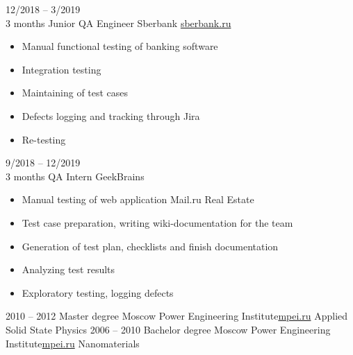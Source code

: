 \documentclass[10pt]{developercv} %
\begin{document}
\begin{entrylist}
	\entry
		{\small{12/2018 -- 3/2019}\\{\footnotesize{3 months}}}
		{Junior QA Engineer}
		{Sberbank \slashsep \href{https://www.sberbank.ru}{sberbank.ru}}
		{
			\vspace{-\baselineskip}
			\begin{itemize}
				\setlength\itemsep{0pt}
				\setlength\itemindent{-\baselineskip}
				\item{Manual functional testing of banking software}
				\item{Integration testing}
				\item{Maintaining of test cases}
				\item{Defects logging and tracking through Jira}
				\item{Re-testing}
			\end{itemize}
		}
	\entry
		{\small{9/2018 -- 12/2019}\\{\footnotesize{3 months}}}
		{QA Intern}
		{GeekBrains}
		{
			\vspace{-\baselineskip}
			\begin{itemize}
				\setlength\itemsep{0pt}
				\setlength\itemindent{-\baselineskip}
				\item{Manual testing of web application Mail.ru Real Estate}
				\item{Test case preparation, writing wiki-documentation for the
					team}
				\item{Generation of test plan, checklists and finish documentation}
				\item{Analyzing test results}
				\item{Exploratory testing, logging defects}
			\end{itemize}
		}
\end{entrylist}



\begin{entrylist}
	\entry
		{\small{2010 -- 2012}}
		{Master degree}
		{Moscow Power Engineering Institute\slashsep \href{https://mpei.ru/}{mpei.ru}}
		{Applied Solid State Physics}
	\entry
		{\small{2006 -- 2010}}
		{Bachelor degree}
		{Moscow Power Engineering Institute\slashsep \href{https://mpei.ru/}{mpei.ru}}
		{Nanomaterials}
\end{entrylist}
\end{document}
